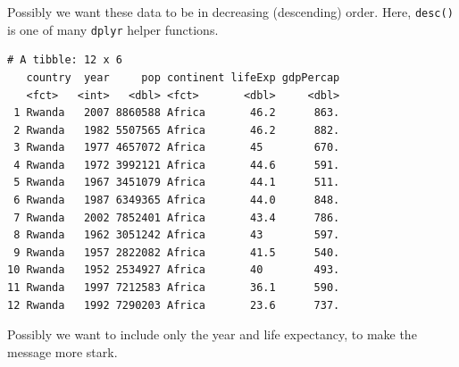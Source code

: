 \documentclass[]{krantz}
\makeatletter
\newenvironment{Shaded}{\begin{snugshade}}{\end{snugshade}}
\newcommand{\KeywordTok}[1]{\textcolor[rgb]{0.27,0.27,0.27}{\textbf{#1}}}
\newcommand{\NormalTok}[1]{#1}
\newcommand{\OperatorTok}[1]{\textcolor[rgb]{0.43,0.43,0.43}{\textbf{#1}}}
\newcommand{\StringTok}[1]{\textcolor[rgb]{0.5,0.5,0.5}{#1}}
\newenvironment{kframe}{%
\medskip{}
\setlength{\fboxsep}{.8em}
 \def\at@end@of@kframe{}%
 \ifinner\ifhmode%
  \def\at@end@of@kframe{\end{minipage}}%
  \begin{minipage}{\columnwidth}%
 \fi\fi%
 \def\FrameCommand##1{\hskip\@totalleftmargin \hskip-\fboxsep
 \colorbox{shadecolor}{##1}\hskip-\fboxsep
     \hskip-\linewidth \hskip-\@totalleftmargin \hskip\columnwidth}%
 \MakeFramed {\advance\hsize-\width
   \@totalleftmargin\z@ \linewidth\hsize
   \@setminipage}}%
 {\par\unskip\endMakeFramed%
 \at@end@of@kframe}
\renewenvironment{Shaded}{\begin{kframe}}{\end{kframe}}
\makeatother
\begin{document}
Possibly we want these data to be in decreasing (descending) order. Here, \texttt{desc()} is one of many \texttt{dplyr} helper functions.

\begin{Shaded}
\end{Shaded}

\begin{verbatim}
# A tibble: 12 x 6
   country  year     pop continent lifeExp gdpPercap
   <fct>   <int>   <dbl> <fct>       <dbl>     <dbl>
 1 Rwanda   2007 8860588 Africa       46.2      863.
 2 Rwanda   1982 5507565 Africa       46.2      882.
 3 Rwanda   1977 4657072 Africa       45        670.
 4 Rwanda   1972 3992121 Africa       44.6      591.
 5 Rwanda   1967 3451079 Africa       44.1      511.
 6 Rwanda   1987 6349365 Africa       44.0      848.
 7 Rwanda   2002 7852401 Africa       43.4      786.
 8 Rwanda   1962 3051242 Africa       43        597.
 9 Rwanda   1957 2822082 Africa       41.5      540.
10 Rwanda   1952 2534927 Africa       40        493.
11 Rwanda   1997 7212583 Africa       36.1      590.
12 Rwanda   1992 7290203 Africa       23.6      737.
\end{verbatim}

Possibly we want to include only the year and life expectancy, to make the message more stark.

\begin{Shaded}
\end{Shaded}
\end{document}
